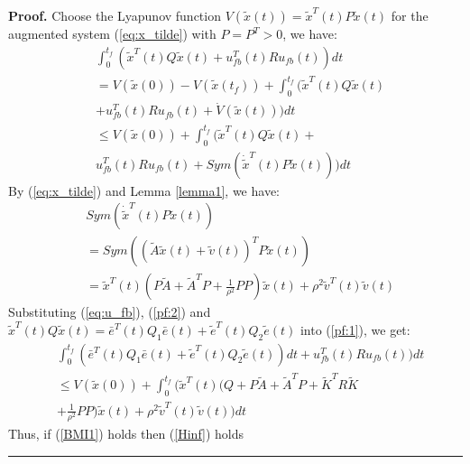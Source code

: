 \documentclass{ieeeaccess}
\newenvironment{proof}[1][Proof]{\noindent\textbf{#1.} }{\ \rule{0.5em}{0.5em}}
\begin{document}
\begin{proof}
    Choose the Lyapunov function $V(\tilde{x}(t))=\tilde{x}^T(t)P\tilde{x}(t)$ for the augmented system (\ref{eq:x_tilde}) with $P=P^T>0$, we have:
    \begin{equation} \label{pf:1}
        \begin{split}
            & \int_{0}^{t_f}(\tilde{x}^T(t)Q\tilde{x}(t) + u_{fb}^T(t)Ru_{fb}(t))dt \\
            & = V(\tilde{x}(0)) - V(\tilde{x}(t_f)) + \int_{0}^{t_f}(\tilde{x}^T(t)Q\tilde{x}(t) \\
            & + u_{fb}^T(t)Ru_{fb}(t) + \dot{V}(\tilde{x}(t)))dt \\
            & \leq V(\tilde{x}(0)) + \int_{0}^{t_f}(\tilde{x}^T(t)Q\tilde{x}(t) + \\
            & u_{fb}^T(t)Ru_{fb}(t) + Sym(\dot{\tilde{x}}^T(t)P\tilde{x}(t)))dt
        \end{split}
    \end{equation}
    By (\ref{eq:x_tilde}) and Lemma \ref{lemma1}, we have:
    \begin{equation} \label{pf:2}
        \begin{split}
            & Sym(\dot{\tilde{x}}^T(t)P\tilde{x}(t)) \\
            & = Sym((\tilde{A}\tilde{x}(t)+\tilde{v}(t))^TP\tilde{x}(t)) \\
            & = \tilde{x}^T(t)(P\tilde{A} + \tilde{A}^T P + \frac{1}{\rho^2}PP)\tilde{x}(t) + \rho^2\tilde{v}^T(t)\tilde{v}(t)
        \end{split}
    \end{equation}
    Substituting (\ref{eq:u_fb}), (\ref{pf:2}) and $\tilde{x}^T(t)Q\tilde{x}(t)=\bar{e}^T(t)Q_1\bar{e}(t)+\tilde{e}^T(t)Q_2\tilde{e}(t)$ into (\ref{pf:1}), we get:
    \begin{equation*} \label{pf:3}
        \begin{split}
            & \int_{0}^{t_f}(\bar{e}^T(t)Q_1\bar{e}(t)+\tilde{e}^T(t)Q_2\tilde{e}(t))dt + u_{fb}^T(t)Ru_{fb}(t))dt \\
            & \leq V(\tilde{x}(0)) + \int_{0}^{t_f}(\tilde{x}^T(t)(Q + P\tilde{A} + \tilde{A}^T P +\tilde{K}^TR\tilde{K}\\
            & + \frac{1}{\rho^2}PP)\tilde{x}(t) + \rho^2\tilde{v}^T(t)\tilde{v}(t))dt
        \end{split}
    \end{equation*}
    Thus, if (\ref{BMI1}) holds then (\ref{Hinf}) holds
\end{proof}
\end{document}
